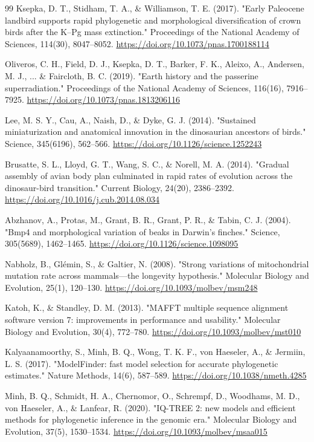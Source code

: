\documentclass[10pt,letterpaper]{article}
\begin{document}
\begin{thebibliography}{99}
 Ksepka, D. T., Stidham, T. A., \& Williamson, T. E. (2017). "Early Paleocene landbird supports rapid phylogenetic and morphological diversification of crown birds after the K--Pg mass extinction." Proceedings of the National Academy of Sciences, 114(30), 8047--8052. \url{https://doi.org/10.1073/pnas.1700188114}

 Oliveros, C. H., Field, D. J., Ksepka, D. T., Barker, F. K., Aleixo, A., Andersen, M. J., ... \& Faircloth, B. C. (2019). "Earth history and the passerine superradiation." Proceedings of the National Academy of Sciences, 116(16), 7916--7925. \url{https://doi.org/10.1073/pnas.1813206116}

 Lee, M. S. Y., Cau, A., Naish, D., \& Dyke, G. J. (2014). "Sustained miniaturization and anatomical innovation in the dinosaurian ancestors of birds." Science, 345(6196), 562--566. \url{https://doi.org/10.1126/science.1252243}

 Brusatte, S. L., Lloyd, G. T., Wang, S. C., \& Norell, M. A. (2014). "Gradual assembly of avian body plan culminated in rapid rates of evolution across the dinosaur-bird transition." Current Biology, 24(20), 2386--2392. \url{https://doi.org/10.1016/j.cub.2014.08.034}

 Abzhanov, A., Protas, M., Grant, B. R., Grant, P. R., \& Tabin, C. J. (2004). "Bmp4 and morphological variation of beaks in Darwin's finches." Science, 305(5689), 1462--1465. \url{https://doi.org/10.1126/science.1098095}

 Nabholz, B., Gl\'emin, S., \& Galtier, N. (2008). "Strong variations of mitochondrial mutation rate across mammals---the longevity hypothesis." Molecular Biology and Evolution, 25(1), 120--130. \url{https://doi.org/10.1093/molbev/msm248}

 Katoh, K., \& Standley, D. M. (2013). "MAFFT multiple sequence alignment software version 7: improvements in performance and usability." Molecular Biology and Evolution, 30(4), 772--780. \url{https://doi.org/10.1093/molbev/mst010}

 Kalyaanamoorthy, S., Minh, B. Q., Wong, T. K. F., von Haeseler, A., \& Jermiin, L. S. (2017). "ModelFinder: fast model selection for accurate phylogenetic estimates." Nature Methods, 14(6), 587--589. \url{https://doi.org/10.1038/nmeth.4285}

 Minh, B. Q., Schmidt, H. A., Chernomor, O., Schrempf, D., Woodhams, M. D., von Haeseler, A., \& Lanfear, R. (2020). "IQ-TREE 2: new models and efficient methods for phylogenetic inference in the genomic era." Molecular Biology and Evolution, 37(5), 1530--1534. \url{https://doi.org/10.1093/molbev/msaa015}


\end{thebibliography}
\end{document}
